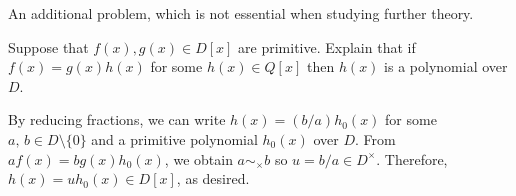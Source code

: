 An additional problem, which is not essential when studying further theory.
\begin{prob}\label{cyclotomic_poly_over_Z}
    Suppose that $f(x), g(x)\in D[x]$ are primitive.
    Explain that if $f(x)=g(x)h(x)$ for some $h(x)\in Q[x]$ then $h(x)$ is a polynomial over $D$.
\end{prob}
\begin{sol}
    By reducing fractions, we can write $h(x)=(b/a)h_0(x)$ for some $a,\,b\in D\setminus\{0\}$ and a primitive polynomial $h_0(x)$ over $D$.
    From $af(x)=bg(x)h_0(x)$, we obtain $a\sim_\times b$ so $u=b/a\in D^\times$.
    Therefore, $h(x)=uh_0(x)\in D[x]$, as desired.
\end{sol}